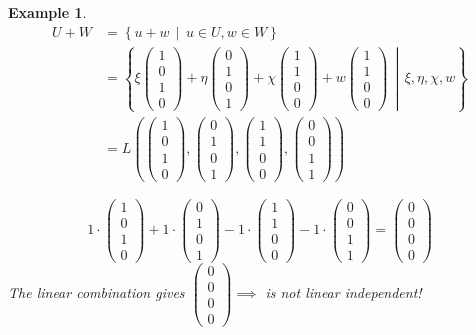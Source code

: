 \documentclass[a4paper,landscape,twocolumn]{article}
\newcommand\setdef[2]{\left\{#1\,\middle|\,#2\right\}}
\newcommand\vecfour[4]{\begin{pmatrix} #1 \\ #2 \\ #3 \\ #4 \end{pmatrix}}
\newtheorem{ex}{Example}[section]
\begin{document}
\begin{ex}
  \begin{align*}
    U+W
    &= \setdef{u+w}{u \in U, w \in W} \\
    &= \setdef{
        \xi \begin{pmatrix} 1 \\ 0 \\ 1 \\ 0 \end{pmatrix} +
        \eta \begin{pmatrix} 0 \\ 1 \\ 0 \\ 1 \end{pmatrix} +
        \chi \begin{pmatrix} 1 \\ 1 \\ 0 \\ 0 \end{pmatrix} +
        w \begin{pmatrix} 1 \\ 1 \\ 0 \\ 0 \end{pmatrix}
      }{\xi, \eta, \chi, w} \\
    &= L\left(\begin{pmatrix} 1 \\ 0 \\ 1 \\ 0 \end{pmatrix},
        \begin{pmatrix} 0 \\ 1 \\ 0 \\ 1 \end{pmatrix},
        \begin{pmatrix} 1 \\ 1 \\ 0 \\ 0 \end{pmatrix},
        \begin{pmatrix} 0 \\ 0 \\ 1 \\ 1 \end{pmatrix}\right)
  \end{align*}

  \[ 1 \cdot \vecfour 1010 + 1 \cdot \vecfour 0101 - 1 \cdot \vecfour 1100 - 1 \cdot \vecfour 0011 = \vecfour 0000 \]
  The linear combination gives $\vecfour 0000 \implies$ is not linear independent!


\end{ex}
\end{document}
